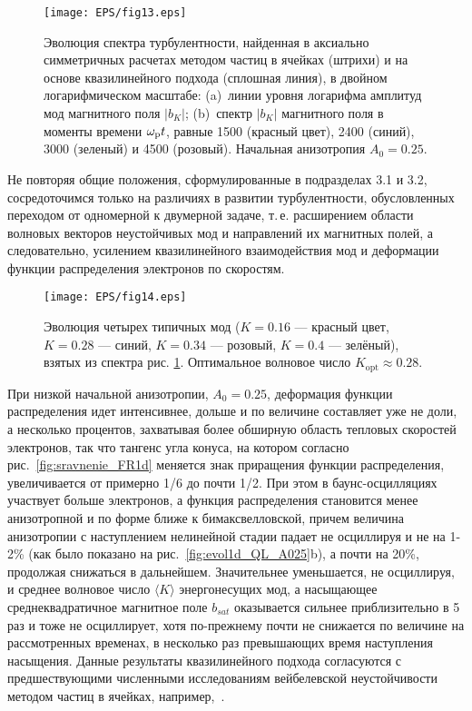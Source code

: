 \begin{figure}[t]
\centering
\texttt{[image: EPS/fig13.eps]}
\caption{Эволюция спектра турбулентности, найденная в аксиально симметричных расчетах методом частиц в ячейках (штрихи) и на основе квазилинейного подхода (сплошная линия), в двойном логарифмическом масштабе: (a)~линии уровня логарифма амплитуд мод магнитного поля $|b_K|$; (b)~спектр $|b_K|$ магнитного поля в моменты времени $\omega_\mathrm{p} t$, равные 1500 (красный цвет), 2400 (синий), 3000 (зеленый) и 4500 (розовый). Начальная анизотропия $A_0=0.25$.
}
\label{fig:dinspectrA025_2d}
\end{figure}


Не повторяя общие положения, сформулированные в подразделах 3.1 и 3.2, сосредоточимся только на различиях в развитии турбулентности, обусловленных переходом от одномерной к двумерной задаче, т.\,е. расширением области волновых векторов неустойчивых мод и направлений их магнитных полей, а следовательно, усилением квазилинейного взаимодействия мод и деформации функции распределения электронов по скоростям.
\begin{figure}[t]
\centering
\texttt{[image: EPS/fig14.eps]}
\caption{Эволюция четырех типичных мод ($K=0.16$ --- красный цвет, $K=0.28$ --- синий, $K=0.34$ --- розовый, $K=0.4$ --- зелёный), взятых из спектра рис. \ref{fig:dinspectrA025_2d}. Оптимальное волновое число $K_\mathrm{opt}\approx0.28$.}
\label{fig:evol_garmA025}
\end{figure}

При низкой начальной анизотропии, $A_0=0.25$, деформация функции распределения идет интенсивнее, дольше и по величине составляет уже не доли, а несколько процентов, захватывая более обширную область тепловых скоростей электронов, так что тангенс угла конуса, на котором согласно рис.~\ref{fig:sravnenie_FR1d} меняется знак приращения функции распределения, увеличивается от примерно 1/6 до почти 1/2. При этом в баунс-осцилляциях участвует больше электронов, а функция распределения становится менее анизотропной и по форме ближе к бимаксвелловской, причем величина анизотропии с наступлением нелинейной стадии падает не осциллируя и не на 1-2\% (как было показано на рис.~\ref{fig:evol1d_QL_A025}b), а почти на 20\%, продолжая снижаться в дальнейшем. Значительнее уменьшается, не осциллируя, и среднее волновое число $\langle K\rangle$ энергонесущих мод, а насыщающее среднеквадратичное магнитное поле $b_{sat}$ оказывается сильнее приблизительно в 5 раз и тоже не осциллирует, хотя по-прежнему почти не снижается по величине на рассмотренных временах, в несколько раз превышающих время наступления насыщения. Данные результаты квазилинейного подхода согласуются с предшествующими численными исследованиям вейбелевской неустойчивости методом частиц в ячейках, например,~\cite{Borodachev2010,Borodachev2016_Radiofiz}. 

